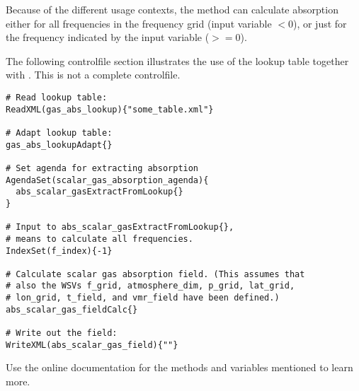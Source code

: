 Because of the different usage contexts, the method
 can calculate absorption
either for all frequencies in the frequency grid (input variable
$<$0), or just for the frequency indicated by the
input variable  ($>=$0).

The following controlfile section illustrates the use of the lookup
table together with . This is
not a complete controlfile. 

\begin{verbatim}
# Read lookup table:
ReadXML(gas_abs_lookup){"some_table.xml"}

# Adapt lookup table:
gas_abs_lookupAdapt{}

# Set agenda for extracting absorption
AgendaSet(scalar_gas_absorption_agenda){
  abs_scalar_gasExtractFromLookup{}
}

# Input to abs_scalar_gasExtractFromLookup{}, 
# means to calculate all frequencies.
IndexSet(f_index){-1}

# Calculate scalar gas absorption field. (This assumes that 
# also the WSVs f_grid, atmosphere_dim, p_grid, lat_grid, 
# lon_grid, t_field, and vmr_field have been defined.)
abs_scalar_gas_fieldCalc{}

# Write out the field:
WriteXML(abs_scalar_gas_field){""}
\end{verbatim}

Use the online documentation for the methods and variables mentioned
to learn more.



